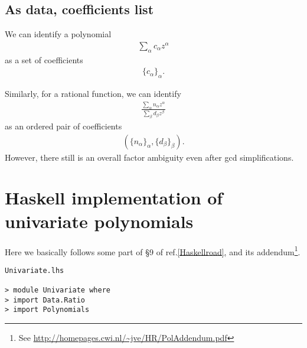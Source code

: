 \documentclass[11pt]{book}
\begin{document}
\subsection{As data, coefficients list}
We can identify a polynomial
\begin{eqnarray}
\sum_\alpha c_\alpha z^\alpha
\end{eqnarray}
as a set of coefficients
\begin{eqnarray}
\{ c_\alpha\}_{\alpha}.
\end{eqnarray}

Similarly, for a rational function, we can identify
\begin{eqnarray}
\frac{\sum_\alpha n_\alpha z^\alpha}{\sum_\beta d_\beta z^\beta}
\end{eqnarray}
as an ordered pair of coefficients
\begin{eqnarray}
(\{ n_\alpha\}_\alpha, \{ d_\beta\}_\beta).
\end{eqnarray}
However, there still is an overall factor ambiguity even after gcd simplifications.

\section{Haskell implementation of univariate polynomials}
Here we basically follows some part of \S9 of ref.\ref{Haskellroad}, and its addendum\footnote{
See \url{http://homepages.cwi.nl/~jve/HR/PolAddendum.pdf}
}.

\begin{verbatim}
Univariate.lhs

> module Univariate where
> import Data.Ratio
> import Polynomials 
\end{verbatim}
\end{document}
